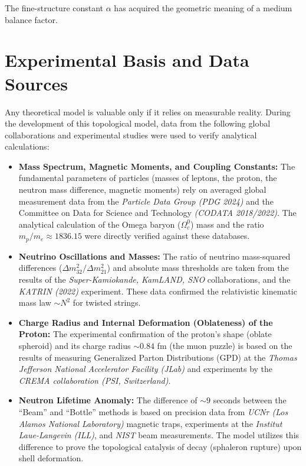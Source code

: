 \documentclass[12pt,a4paper]{article}
\begin{document}
The fine-structure constant $\alpha$ has acquired the geometric meaning of a medium balance factor.

\section*{Experimental Basis and Data Sources}
Any theoretical model is valuable only if it relies on measurable reality. During the development of this topological model, data from the following global collaborations and experimental studies were used to verify analytical calculations:

\begin{itemize}
	\item \textbf{Mass Spectrum, Magnetic Moments, and Coupling Constants:} 
	The fundamental parameters of particles (masses of leptons, the proton, the neutron mass difference, magnetic moments) rely on averaged global measurement data from the \textit{Particle Data Group (PDG 2024)} and the Committee on Data for Science and Technology \textit{(CODATA 2018/2022)}. The analytical calculation of the Omega baryon ($\Omega_c^0$) mass and the ratio $m_p/m_e \approx 1836.15$ were directly verified against these databases.
	
	\item \textbf{Neutrino Oscillations and Masses:} 
	The ratio of neutrino mass-squared differences ($\Delta m^2_{32}/\Delta m^2_{21}$) and absolute mass thresholds are taken from the results of the \textit{Super-Kamiokande, KamLAND, SNO} collaborations, and the \textit{KATRIN (2022)} experiment. These data confirmed the relativistic kinematic mass law $\sim N^2$ for twisted strings.
	
	\item \textbf{Charge Radius and Internal Deformation (Oblateness) of the Proton:} 
	The experimental confirmation of the proton's shape (oblate spheroid) and its charge radius $\sim 0.84$ fm (the muon puzzle) is based on the results of measuring Generalized Parton Distributions (GPD) at the \textit{Thomas Jefferson National Accelerator Facility (JLab)} and experiments by the \textit{CREMA collaboration (PSI, Switzerland)}.
	
	\item \textbf{Neutron Lifetime Anomaly:} 
	The difference of $\sim 9$ seconds between the ``Beam'' and ``Bottle'' methods is based on precision data from \textit{UCN$\tau$ (Los Alamos National Laboratory)} magnetic traps, experiments at the \textit{Institut Laue-Langevin (ILL)}, and \textit{NIST} beam measurements. The model utilizes this difference to prove the topological catalysis of decay (sphaleron rupture) upon shell deformation.
\end{itemize}
\end{document}
